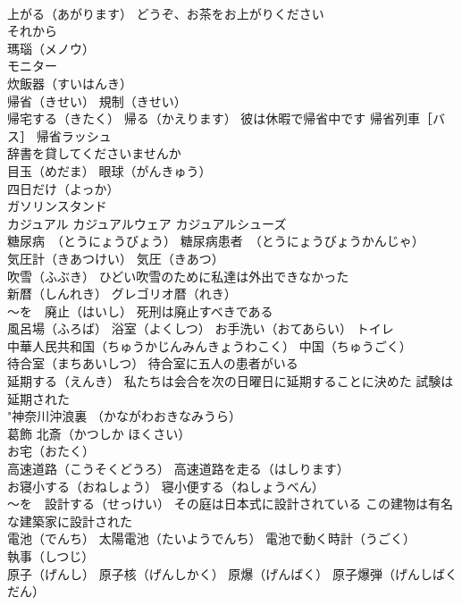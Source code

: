\documentclass[8pt]{extreport}
\begin{document}
\begin{CJK}{UTF8}{min}
\\	上がる（あがります） どうぞ、お茶をお上がりください
\\	それから
\\	瑪瑙（メノウ）
\\	モニター
\\	炊飯器（すいはんき）
\\	帰省（きせい） 規制（きせい） 
\\	帰宅する（きたく） 帰る（かえります） 彼は休暇で帰省中です 帰省列車［バス］ 帰省ラッシュ
\\	辞書を貸してくださいませんか
\\	目玉（めだま） 眼球（がんきゅう）
\\	四日だけ（よっか）
\\	ガソリンスタンド
\\	カジュアル カジュアルウェア カジュアルシューズ
\\	糖尿病　（とうにょうびょう） 糖尿病患者　（とうにょうびょうかんじゃ）
\\	気圧計（きあつけい） 気圧（きあつ）
\\	吹雪（ふぶき） ひどい吹雪のために私達は外出できなかった
\\	新暦（しんれき） グレゴリオ暦（れき）
\\	～を　廃止（はいし） 死刑は廃止すべきである
\\	風呂場（ふろば） 浴室（よくしつ） お手洗い（おてあらい） トイレ
\\	中華人民共和国（ちゅうかじんみんきょうわこく） 中国（ちゅうごく）
\\	待合室（まちあいしつ） 待合室に五人の患者がいる
\\	延期する（えんき） 私たちは会合を次の日曜日に延期することに決めた 試験は延期された
\\	"神奈川沖浪裏 （かながわおきなみうら） 
\\	葛飾 北斎（かつしか ほくさい）
\\	お宅（おたく）
\\	高速道路（こうそくどうろ） 高速道路を走る（はしります）
\\	お寝小する（おねしょう） 寝小便する（ねしょうべん）
\\	～を　設計する（せっけい） その庭は日本式に設計されている この建物は有名な建築家に設計された
\\	電池（でんち） 太陽電池（たいようでんち） 電池で動く時計（うごく）
\\	執事（しつじ）
\\	原子（げんし） 原子核（げんしかく） 原爆（げんばく） 原子爆弾（げんしばくだん）

\end{CJK}
\end{document}
